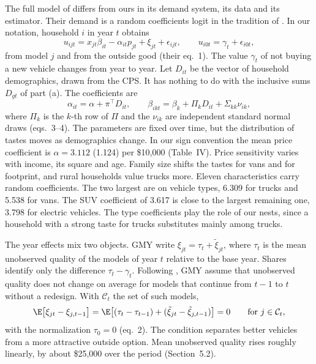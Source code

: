 The full model of \citet{GriecoMurryYurukoglu2024} differs from ours in its demand system, its data and its estimator.
Their demand is a random coefficients logit in the tradition of \citet{BerryLevinsohnPakes1995}. In our notation,
household $i$ in year $t$ obtains
\begin{equation}\label{eq:C-gmy-utility}
  u_{ijt} = x_{jt}\beta_{it} - \alpha_{it}p_{jt} + \xi_{jt} + \epsilon_{ijt} , \qquad u_{i0t} = \gamma_t + \epsilon_{i0t} ,
\end{equation}
from model $j$ and from the outside good (their eq.~1). The value $\gamma_t$ of not buying a new vehicle changes from
year to year. Let $D_{it}$ be the vector of household demographics, drawn from the CPS. It has nothing to do with the
inclusive sums $D_{gt}$ of part (a). The coefficients are
\begin{equation}\label{eq:C-gmy-coef}
  \alpha_{it} = \alpha + \pi^\top D_{it} , \qquad \beta_{ikt} = \beta_k + \Pi_kD_{it} + \Sigma_{kk}\nu_{ik} ,
\end{equation}
where $\Pi_k$ is the $k$-th row of $\Pi$ and the $\nu_{ik}$ are independent standard normal draws (eqs.~3--4). The
parameters are fixed over time, but the distribution of tastes moves as demographics change. In our sign convention the
mean price coefficient is $\alpha = 3.112$ (1.124) per \$10,000 (Table~IV). Price sensitivity varies with income, its
square and age. Family size shifts the tastes for vans and for footprint, and rural households value trucks more. Eleven
characteristics carry random coefficients. The two largest are on vehicle types, 6.309 for trucks and 5.538 for vans.
The SUV coefficient of 3.617 is close to the largest remaining one, 3.798 for electric vehicles. The type coefficients
play the role of our nests, since a household with a strong taste for trucks substitutes mainly among trucks.

The year effects mix two objects. GMY write $\xi_{jt} = \tau_t + \tilde\xi_{jt}$, where $\tau_t$ is the mean
unobserved quality of the models of year $t$ relative to the base year. Shares identify only the difference
$\tau_t - \gamma_t$. Following \citet{PakesBerryLevinsohn1993}, GMY assume that unobserved quality does not change on
average for models that continue from $t - 1$ to $t$ without a redesign. With $\mathcal{C}_t$ the set of such models,
\begin{equation}\label{eq:C-gmy-continuing}
  \E\big[\xi_{jt} - \xi_{j,t-1}\big] = \E\big[(\tau_t - \tau_{t-1}) + (\tilde\xi_{jt} - \tilde\xi_{j,t-1})\big] = 0
  \qquad \text{for } j \in \mathcal{C}_t ,
\end{equation}
with the normalization $\tau_0 = 0$ (eq.~2). The condition separates better vehicles from a more attractive outside
option. Mean unobserved quality rises roughly linearly, by about \$25,000 over the period (Section~5.2).

